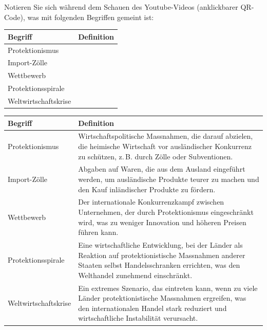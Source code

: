 \begin{myexercise}
Notieren Sie sich während dem Schauen des Youtube-Videos (anklickbarer QR-Code), was mit folgenden Begriffen gemeint ist:

\begin{table}[H]
\centering\small
\begin{tabular}{l|p{10cm}}
\textbf{Begriff} & \textbf{Definition} \\
\midrule\midrule
Protektionismus &  \\[1.3cm]\midrule
Import-Zölle &  \\[1.3cm]\midrule
Wettbewerb &  \\[1.3cm]\midrule
Protektionsspirale &  \\[1.3cm]\midrule
Weltwirtschaftskrise &  \\[1.3cm]
\end{tabular}
\end{table}

\begin{myanswer}
\begin{table}[H]
\centering\small
\begin{tabular}{l|p{10cm}}
\textbf{Begriff} & \textbf{Definition} \\
\midrule\midrule
Protektionismus & Wirtschaftspolitische Massnahmen, die darauf abzielen, die heimische Wirtschaft vor ausländischer Konkurrenz zu schützen, z. B. durch Zölle oder Subventionen. \\\midrule
Import-Zölle & Abgaben auf Waren, die aus dem Ausland eingeführt werden, um ausländische Produkte teurer zu machen und den Kauf inländischer Produkte zu fördern. \\\midrule
Wettbewerb & Der internationale Konkurrenzkampf zwischen Unternehmen, der durch Protektionismus eingeschränkt wird, was zu weniger Innovation und höheren Preisen führen kann. \\\midrule
Protektionsspirale & Eine wirtschaftliche Entwicklung, bei der Länder als Reaktion auf protektionistische Massnahmen anderer Staaten selbst Handelsschranken errichten, was den Welthandel zunehmend einschränkt. \\\midrule
Weltwirtschaftskrise & Ein extremes Szenario, das eintreten kann, wenn zu viele Länder protektionistische Massnahmen ergreifen, was den internationalen Handel stark reduziert und wirtschaftliche Instabilität verursacht. \\
\end{tabular}
\end{table}
\end{myanswer}
\end{myexercise}

